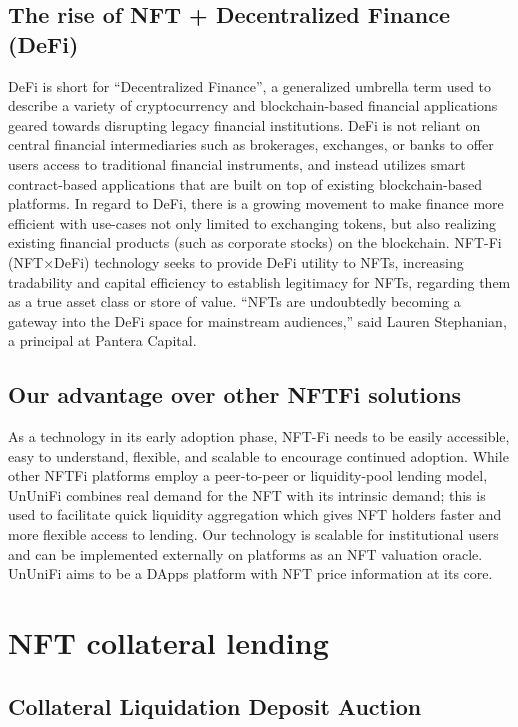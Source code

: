 \documentclass[dvipdfmx]{jsarticle}
\begin{document}
\subsection{The rise of NFT + Decentralized Finance (DeFi)}
DeFi is short for “Decentralized Finance”, a generalized umbrella term used to describe a variety of cryptocurrency and blockchain-based financial applications geared towards disrupting legacy financial institutions. 
DeFi is not reliant on central financial intermediaries such as brokerages, exchanges, or banks to offer users access to traditional financial instruments, and instead utilizes smart contract-based applications that are built on top of existing blockchain-based platforms. 
In regard to DeFi, there is a growing movement to make finance more efficient with use-cases not only limited to exchanging tokens, but also realizing existing financial products (such as corporate stocks) on the blockchain.
NFT-Fi (NFT×DeFi) technology seeks to provide DeFi utility to NFTs, increasing tradability and capital efficiency to establish legitimacy for NFTs, regarding them as a true asset class or store of value. 
“NFTs are undoubtedly becoming a gateway into the DeFi space for mainstream audiences,” said Lauren Stephanian, a principal at Pantera Capital. 

\subsection{Our advantage over other NFTFi solutions}
As a technology in its early adoption phase, NFT-Fi needs to be easily accessible, easy to understand, flexible, and scalable to encourage continued adoption. 
While other NFTFi platforms employ a peer-to-peer or liquidity-pool lending model, UnUniFi combines real demand for the NFT with its intrinsic demand; this is used to facilitate quick liquidity aggregation which gives NFT holders faster and more flexible access to lending. 
Our technology is scalable for institutional users and can be implemented externally on platforms as an NFT valuation oracle. 
UnUniFi aims to be a DApps platform with NFT price information at its core.


\section{NFT collateral lending}

\subsection{Collateral Liquidation Deposit Auction}
\end{document}
